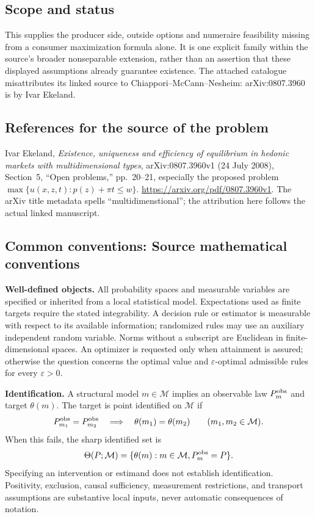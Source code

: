 \documentclass[11pt,a4paper]{article}
\begin{document}
\subsection*{Scope and status}
This supplies the producer side, outside options and numeraire feasibility missing from a consumer maximization formula alone. It is one explicit family within the source's broader nonseparable extension, rather than an assertion that these displayed assumptions already guarantee existence. The attached catalogue misattributes its linked source to Chiappori--McCann--Nesheim: arXiv:0807.3960 is by Ivar Ekeland.
\subsection*{References for the source of the problem}
Ivar Ekeland, \emph{Existence, uniqueness and efficiency of equilibrium in hedonic markets with multidimensional types}, arXiv:0807.3960v1 (24 July 2008), Section~5, ``Open problems,'' pp.~20--21, especially the proposed problem $\max\{u(x,z,t):p(z)+\pi t\le w\}$. \url{https://arxiv.org/pdf/0807.3960v1}. The arXiv title metadata spells ``multidimenstional''; the attribution here follows the actual linked manuscript.

\subsection*{Common conventions: Source mathematical conventions}

\textbf{Well-defined objects.}
All probability spaces and measurable variables are specified or inherited
from a local statistical model. Expectations used as finite targets require
the stated integrability. A decision rule or estimator is measurable with
respect to its available information; randomized rules may use an auxiliary
independent random variable. Norms without a subscript are Euclidean in
finite-dimensional spaces. An optimizer is requested only when attainment
is assured; otherwise the question concerns the optimal value and
$\varepsilon$-optimal admissible rules for every $\varepsilon>0$.

\textbf{Identification.}
A structural model $m\in\mathcal M$ implies an observable law
$P_m^{\rm obs}$ and target $\theta(m)$. The target is point identified on
$\mathcal M$ if
\[
 P_{m_1}^{\rm obs}=P_{m_2}^{\rm obs}
 \quad\Longrightarrow\quad\theta(m_1)=\theta(m_2)
 \qquad(m_1,m_2\in\mathcal M).
\]
When this fails, the sharp identified set is
\[
 \Theta(P;\mathcal M)=\{\theta(m):m\in\mathcal M,
                                  P_m^{\rm obs}=P\}.
\]
Specifying an intervention or estimand does not establish identification.
Positivity, exclusion, causal sufficiency, measurement restrictions, and
transport assumptions are substantive local inputs, never automatic
consequences of notation.
\end{document}
